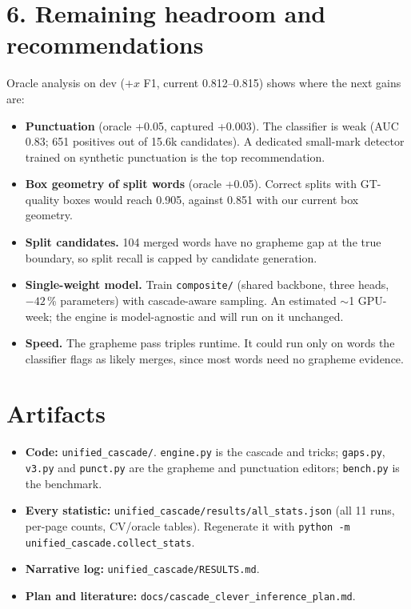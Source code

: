 \documentclass[10.5pt,a4paper]{article}
\begin{document}
\section*{6. Remaining headroom and recommendations}
Oracle analysis on dev ($+x$ F1, current 0.812--0.815) shows where the next gains are:
\begin{itemize}
  \item \textbf{Punctuation} (oracle +0.05, captured +0.003). The classifier is weak (AUC 0.83;
        651 positives out of 15.6k candidates). A dedicated small-mark detector trained on
        synthetic punctuation is the top recommendation.
  \item \textbf{Box geometry of split words} (oracle +0.05). Correct splits with GT-quality boxes
        would reach 0.905, against 0.851 with our current box geometry.
  \item \textbf{Split candidates.} 104 merged words have no grapheme gap at the true boundary, so
        split recall is capped by candidate generation.
  \item \textbf{Single-weight model.} Train \texttt{composite/} (shared backbone, three heads,
        $-42$\,\% parameters) with cascade-aware sampling. An estimated $\sim$1 GPU-week; the engine
        is model-agnostic and will run on it unchanged.
  \item \textbf{Speed.} The grapheme pass triples runtime. It could run only on words the
        classifier flags as likely merges, since most words need no grapheme evidence.
\end{itemize}

\section*{Artifacts}
\begin{itemize}
  \item \textbf{Code:} \texttt{unified\_cascade/}. \texttt{engine.py} is the cascade and tricks;
        \texttt{gaps.py}, \texttt{v3.py} and \texttt{punct.py} are the grapheme and punctuation
        editors; \texttt{bench.py} is the benchmark.
  \item \textbf{Every statistic:} \texttt{unified\_cascade/results/all\_stats.json} (all 11 runs,
        per-page counts, CV/oracle tables). Regenerate it with
        \texttt{python -m unified\_cascade.collect\_stats}.
  \item \textbf{Narrative log:} \texttt{unified\_cascade/RESULTS.md}.
  \item \textbf{Plan and literature:} \texttt{docs/cascade\_clever\_inference\_plan.md}.
\end{itemize}
\end{document}
